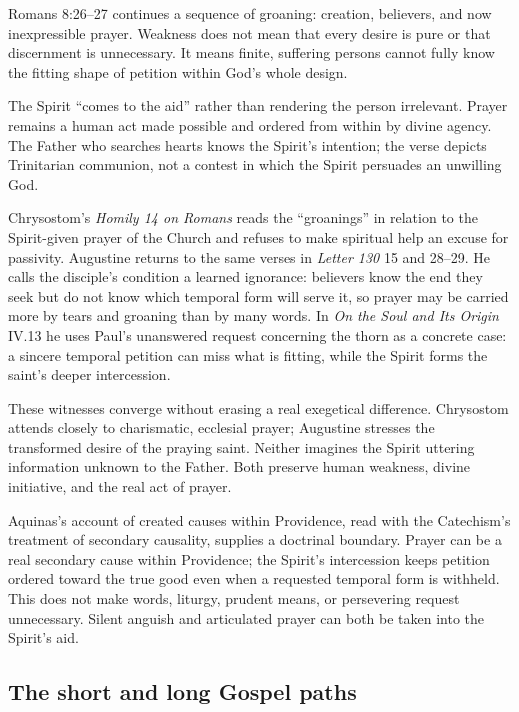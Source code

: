 \begin{deepstudy}
Romans 8:26--27 continues a sequence of groaning: creation, believers, and now inexpressible prayer. Weakness does not mean that every desire is pure or that discernment is unnecessary. It means finite, suffering persons cannot fully know the fitting shape of petition within God's whole design.

The Spirit “comes to the aid” rather than rendering the person irrelevant. Prayer remains a human act made possible and ordered from within by divine agency. The Father who searches hearts knows the Spirit's intention; the verse depicts Trinitarian communion, not a contest in which the Spirit persuades an unwilling God.

Chrysostom's \emph{Homily 14 on Romans} reads the “groanings” in relation to the Spirit-given prayer of the Church and refuses to make spiritual help an excuse for passivity. Augustine returns to the same verses in \emph{Letter 130} 15 and 28--29. He calls the disciple's condition a learned ignorance: believers know the end they seek but do not know which temporal form will serve it, so prayer may be carried more by tears and groaning than by many words. In \emph{On the Soul and Its Origin} IV.13 he uses Paul's unanswered request concerning the thorn as a concrete case: a sincere temporal petition can miss what is fitting, while the Spirit forms the saint's deeper intercession.

These witnesses converge without erasing a real exegetical difference. Chrysostom attends closely to charismatic, ecclesial prayer; Augustine stresses the transformed desire of the praying saint. Neither imagines the Spirit uttering information unknown to the Father. Both preserve human weakness, divine initiative, and the real act of prayer.

Aquinas's account of created causes within Providence, read with the Catechism's treatment of secondary causality, supplies a doctrinal boundary. Prayer can be a real secondary cause within Providence; the Spirit's intercession keeps petition ordered toward the true good even when a requested temporal form is withheld. This does not make words, liturgy, prudent means, or persevering request unnecessary. Silent anguish and articulated prayer can both be taken into the Spirit's aid.

\subsection*{The short and long Gospel paths\enspace{}}


\end{deepstudy}
